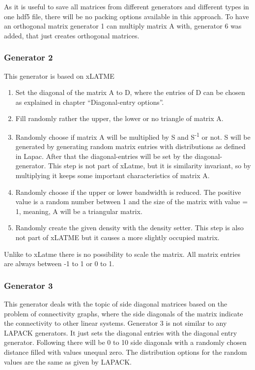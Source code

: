 \documentclass[parskip=full]{scrartcl}
\begin{document}
As it is useful to save all matrices from different generators and different types in one hdf5 file, there will be no packing options available in this approach.
To have an orthogonal matrix generator 1 can multiply matrix A with, generator 6 was added, that just creates orthogonal matrices.


\subsubsection{Generator 2}
This generator is based on xLATME
\begin{enumerate}
	\item Set the diagonal of the matrix A to D, where the entries of D can be chosen as explained in chapter “Diagonal-entry options”.
	\item Fill randomly rather the upper, the lower or no triangle of matrix A.
	\item Randomly choose if matrix A will be multiplied by S and S\textsuperscript{-1} or not. S will be generated by generating random matrix entries with distributions as defined in Lapac. After that the diagonal-entries will be set by the diagonal-generator.
	This step is not part of xLatme, but it is similarity invariant, so by multiplying it keeps some important characteristics of matrix A.
	\item Randomly choose if the upper or lower bandwidth is reduced. The positive value is a random number between 1 and the size of the matrix with value = 1, meaning, A will be a triangular matrix.
	\item Randomly create the given density with the density setter. This step is also not part of xLATME but it causes a more slightly occupied matrix.
\end{enumerate}
Unlike to xLatme there is no possibility to scale the matrix. All matrix entries are always between -1 to 1 or 0 to 1.

\subsubsection{Generator 3}
This generator deals with the topic of side diagonal matrices based on the problem of connectivity graphs, where the side diagonals of the matrix indicate the connectivity to other linear systems.
Generator 3 is not similar to any LAPACK generators. It just sets the diagonal entries with the diagonal entry generator. Following there will be 0 to 10 side diagonals with a randomly chosen distance filled with values unequal zero.
The distribution options for the random values are the same as given by LAPACK.
\end{document}
